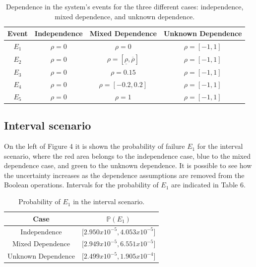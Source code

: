 \documentclass[runningheads]{llncs}
\begin{document}
\begin{table}[!ht]
\centering
\caption{Dependence in the system's events for the three different cases: independence, mixed dependence, and unknown dependence.}\label{tab1}
\begin{tabular}{|c|c|c|c|}
\hline
 Event  & Independence & Mixed Dependence                         & Unknown Dependence                       \\ \hline
$E_1$ & $\rho = 0$   & $\rho = 0$                               & $\rho = [-1, 1]$ \\ \hline
$E_2$ & $\rho = 0$   & $\rho = [\underline\rho, \overline\rho]$ & $\rho = [-1, 1]$ \\ \hline
$E_3$ & $\rho = 0$   & $\rho = 0.15$                            & $\rho = [-1, 1]$ \\ \hline
$E_4$ & $\rho = 0$   & $\rho = [-0.2, 0.2]$                               & $\rho = [-1, 1]$ \\ \hline
$E_5$ & $\rho = 0$   & $\rho = 1$                               & $\rho = [-1, 1]$ \\ \hline
\end{tabular}
\end{table}

\subsection{Interval scenario}

On the left of Figure 4 it is shown the probability of failure $E_1$ for the interval scenario, where the red area belongs to the independence case, blue to the mixed dependence case, and green to the unknown dependence.
It is possible to see how the uncertainty increases as the dependence assumptions are removed from the Boolean operations.
Intervals for the probability of $E_1$ are indicated in Table 6.

\begin{table}[!th]
\centering
\caption{Probability of $E_1$ in the interval scenario.}\label{tab1}
\begin{tabular}{|c|c|}
\hline
Case               & $\mathbb{P}(E_1)$                   \\ \hline
Independence       & ${[}2.950x10^{-5}, 4.053x10^{-5}{]}$ \\ \hline
Mixed Dependence   & ${[}2.949x10^{-5}, 6.551x10^{-5}{]}$ \\ \hline
Unknown Dependence & ${[}2.499x10^{-5}, 1.905x10^{-4}{]}$  \\ \hline
\end{tabular}
\end{table}
\end{document}
